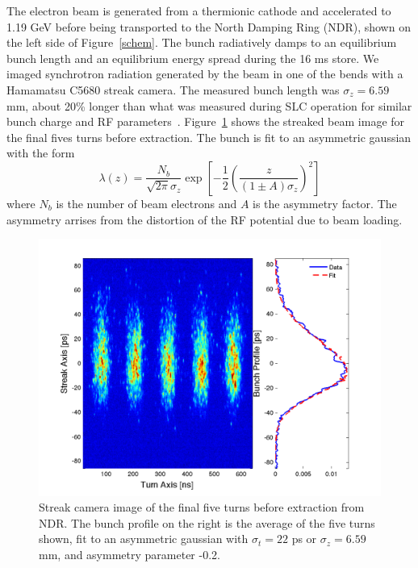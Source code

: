 \documentclass[%
twocolumn,
showpacs,preprintnumbers,
 aps,
prstab,
]{revtex4-1}
\begin{document}
The electron beam is generated from a thermionic cathode and accelerated to 1.19 GeV before being transported to the North Damping Ring (NDR), shown on the left side of Figure~\ref{schem}. The bunch radiatively damps to an equilibrium bunch length and an equilibrium energy spread during the 16 ms store. We imaged synchrotron radiation generated by the beam in one of the bends with a Hamamatsu C5680 streak camera. The measured bunch length was $\sigma_z = 6.59$ mm, about 20\% longer than what was measured during SLC operation for similar bunch charge and RF parameters~\cite{Holtzapple}. Figure~\ref{streak} shows the streaked beam image for the final fives turns before extraction. The bunch is fit to an asymmetric gaussian with the form
\begin{equation}
 \lambda(z) = \frac{N_b}{\sqrt{2\pi}\sigma_z}\exp{ \left[-\frac{1}{2}\left(\frac{z}{(1\pm A)\sigma_z}\right)^2\right]}
\end{equation}
where $N_b$ is the number of beam electrons and $A$ is the asymmetry factor. The asymmetry arrises from the distortion of the RF potential due to beam loading.

\begin{figure}[htb]
  \includegraphics[width=\columnwidth]{figures/combo.pdf}
  \caption{Streak camera image of the final five turns before extraction from NDR. The bunch profile on the right is the average of the five turns shown, fit to an asymmetric gaussian with $\sigma_t = 22$ ps or $\sigma_z = 6.59$ mm, and asymmetry parameter -0.2.}
  \label{streak}
\end{figure}
\end{document}
